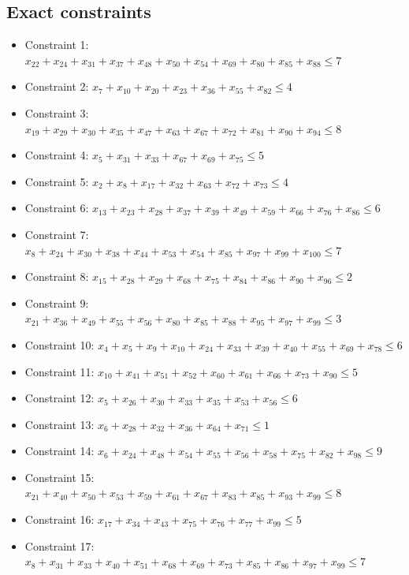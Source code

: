 \documentclass[11pt]{article}
\begin{document}
\subsection*{Exact constraints}
\begin{itemize}
\item Constraint 1: $x_{22} + x_{24} + x_{31} + x_{37} + x_{48} + x_{50} + x_{54} + x_{69} + x_{80} + x_{85} + x_{88} \le 7$
\item Constraint 2: $x_{7} + x_{10} + x_{20} + x_{23} + x_{36} + x_{55} + x_{82} \le 4$
\item Constraint 3: $x_{19} + x_{29} + x_{30} + x_{35} + x_{47} + x_{63} + x_{67} + x_{72} + x_{81} + x_{90} + x_{94} \le 8$
\item Constraint 4: $x_{5} + x_{31} + x_{33} + x_{67} + x_{69} + x_{75} \le 5$
\item Constraint 5: $x_{2} + x_{8} + x_{17} + x_{32} + x_{63} + x_{72} + x_{73} \le 4$
\item Constraint 6: $x_{13} + x_{23} + x_{28} + x_{37} + x_{39} + x_{49} + x_{59} + x_{66} + x_{76} + x_{86} \le 6$
\item Constraint 7: $x_{8} + x_{24} + x_{30} + x_{38} + x_{44} + x_{53} + x_{54} + x_{85} + x_{97} + x_{99} + x_{100} \le 7$
\item Constraint 8: $x_{15} + x_{28} + x_{29} + x_{68} + x_{75} + x_{84} + x_{86} + x_{90} + x_{96} \le 2$
\item Constraint 9: $x_{21} + x_{36} + x_{49} + x_{55} + x_{56} + x_{80} + x_{85} + x_{88} + x_{95} + x_{97} + x_{99} \le 3$
\item Constraint 10: $x_{4} + x_{5} + x_{9} + x_{10} + x_{24} + x_{33} + x_{39} + x_{40} + x_{55} + x_{69} + x_{78} \le 6$
\item Constraint 11: $x_{10} + x_{41} + x_{51} + x_{52} + x_{60} + x_{61} + x_{66} + x_{73} + x_{90} \le 5$
\item Constraint 12: $x_{5} + x_{26} + x_{30} + x_{33} + x_{35} + x_{53} + x_{56} \le 6$
\item Constraint 13: $x_{6} + x_{28} + x_{32} + x_{36} + x_{64} + x_{71} \le 1$
\item Constraint 14: $x_{6} + x_{24} + x_{48} + x_{54} + x_{55} + x_{56} + x_{58} + x_{75} + x_{82} + x_{98} \le 9$
\item Constraint 15: $x_{21} + x_{40} + x_{50} + x_{53} + x_{59} + x_{61} + x_{67} + x_{83} + x_{85} + x_{93} + x_{99} \le 8$
\item Constraint 16: $x_{17} + x_{34} + x_{43} + x_{75} + x_{76} + x_{77} + x_{99} \le 5$
\item Constraint 17: $x_{8} + x_{31} + x_{33} + x_{40} + x_{51} + x_{68} + x_{69} + x_{73} + x_{85} + x_{86} + x_{97} + x_{99} \le 7$

\end{itemize}
\end{document}
